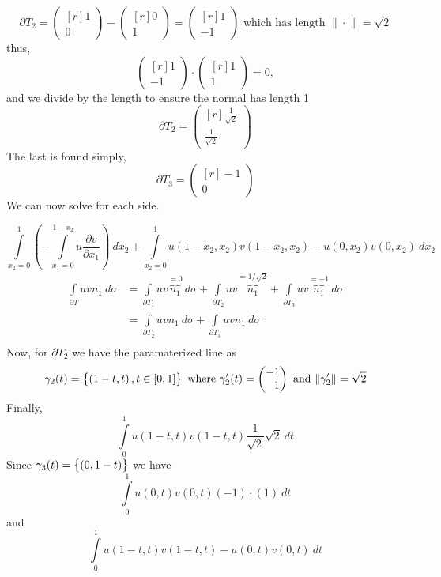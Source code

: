 \[
\partial T_2 = \begin{pmatrix*}[r]
     1 \\
     0 
\end{pmatrix*}
- \begin{pmatrix*}[r]
    0 \\
    1 
\end{pmatrix*}
= \begin{pmatrix*}[r]
     1 \\
    -1 
\end{pmatrix*}
\text{ which has length } \| \cdot  \|^{ }_{ } = \sqrt{2}
\]
thus, 
\[
\begin{pmatrix*}[r]
     1 \\
     -1 
\end{pmatrix*}
\cdot \begin{pmatrix*}[r]
     1 \\
     1 
\end{pmatrix*}
= 0 , 
\]
 and we divide by the length to ensure the normal has length 1
\[
\partial T_2 = \begin{pmatrix*}[r]
    \frac{ 1 }{ \sqrt{2}} \\[0.5em]
    \frac{ 1 }{ \sqrt{2} }  
\end{pmatrix*}
\]
The last is found simply, 
\[
\partial T_3 = \begin{pmatrix*}[r]
    -1 \\
     0
\end{pmatrix*}
\]
We can now solve for each side. 

\[
    \int\limits_{x_2=0}^{1} \left( - \int\limits_{x_1=0}^{1-x_2} u \frac{ \partial v  }{
    \partial x_1 } \right) \ dx_2 +  \int\limits_{x_2=0}^{1} u\left( 1-x_2, x_2\right)
    v\left( 1-x_2, x_2\right) - u\left( 0,x_2\right) v\left( 0,x_2\right) \ dx_2
\]
\begin{align*}
    \int\limits_{ \partial T}^{ } uvn_1 \ d\sigma &= \int\limits_{ \partial
    T_1}^{ } uv\overbrace{ n_1}^{=0} \ d\sigma + \int\limits_{ \partial T_2 }^{ }
    uv\overbrace{n_1}^{=1/\sqrt{2}} + \int\limits_{ \partial T_3}^{ }
    uv\overbrace{n_1}^{=-1} \ d \sigma \\
     &= \int\limits_{ \partial T_2}^{} uvn_1 \ d\sigma + \int\limits_{ \partial T_3}^{ }
     uvn_1 \ d\sigma   \\ 
\end{align*}
Now, for $ \partial T_2 $ we have the paramaterized line as 
\[
    \gamma_2 (t) = \set{ \left( 1-t, t\right) , t\in [0,1] } \text{ where } \gamma_2'(t) =
    \begin{pmatrix*}[r]
        -1 \\
         1 
    \end{pmatrix*}
    \text{ and } 
    \| \gamma_2' \|^{ }_{ } = \sqrt{2}
\]
Finally, 
\[
    \int\limits_{0}^{1} u\left( 1-t, t\right) v\left( 1-t, t\right) \frac{ 1 }{ \sqrt{2} }
    \sqrt{2} \ dt 
\]
Since $ \gamma_3(t) = \set{ \left( 0, 1-t\right)  }  $ we have 
\[
    \int\limits_{0}^{1} u\left( 0,t\right) v\left( 0,t\right) (-1) \cdot (1) \ dt
\]
and 
\[
\int\limits_{0}^{1} u\left( 1-t, t\right) v\left( 1-t, t\right) -  u\left( 0,t\right) 
v\left( 0,t\right) \ dt
\]

